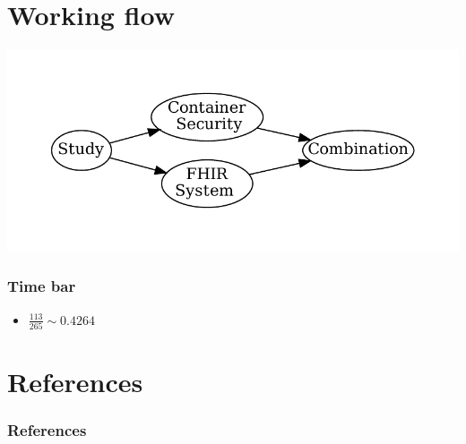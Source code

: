 \documentclass{beamer}
\begin{document}
\begin{CJK*}{UTF8}{bsmi}
    \section{Working flow}
    \begin{frame}
        \includegraphics[width=\textwidth]{../0416/methFlow.pdf}
    \end{frame}

    \begin{frame}
        \frametitle{Time bar}
        \begin{itemize}
            \item {}  $\frac{113}{265} \sim 0.4264$
        \end{itemize}
    \end{frame}

    \section{References}
    \begin{frame}[t, allowframebreaks]
        \frametitle{References}
        \renewcommand*{\bibfont}{\scriptsize}
        \printbibliography
    \end{frame}

\end{CJK*}
\end{document}
